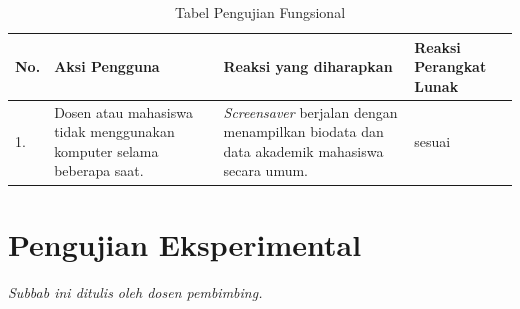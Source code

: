 \begin{table}[H]
	\centering
	\caption{Tabel Pengujian Fungsional}
	\begin{tabular}{|p{0.5cm}| p{5.5cm}| p{5.5cm}| p{3cm}|} \hline
	No.	&	Aksi Pengguna	&	Reaksi yang diharapkan	&	Reaksi Perangkat Lunak \\ \hline
	1.	&	Dosen atau mahasiswa tidak menggunakan komputer selama beberapa saat. 	&	\textit{Screensaver} berjalan dengan menampilkan biodata dan data akademik mahasiswa secara umum.	&	sesuai	\\ \hline
	\end{tabular}
	\label{table:hasilFungsional}
\end{table}


\section{Pengujian Eksperimental}
\textit{Subbab ini ditulis oleh dosen pembimbing.}
